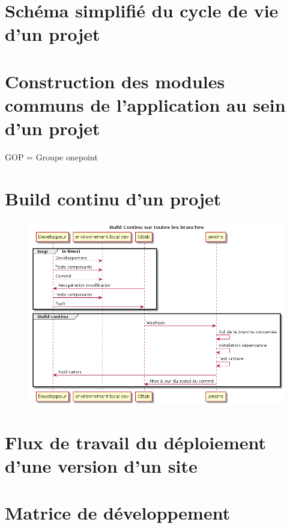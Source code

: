 \section{Schéma simplifié du cycle de vie d'un projet}

\clearpage
\section{Construction des modules communs de l'application au sein d'un projet \naq}

\normalsize{GOP = Groupe onepoint}


\clearpage
\section{Build continu d'un projet \naq}
\begin{figure}[ht]
	\centering
	\includegraphics[scale=0.6,angle=-90]{img/build-continu.png}
	\label{annexe:build-continu}
\end{figure}

\clearpage
\section{Flux de travail du déploiement d'une version d'un site \naq}

\clearpage
\section{Matrice de développement \devops}

